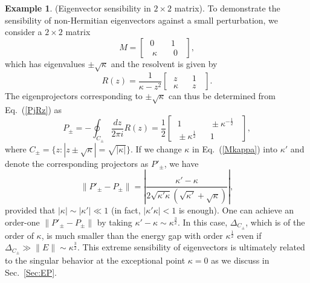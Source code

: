 \documentclass{tADP2e}
\theoremstyle{plain}
\theoremstyle{plain}
\theoremstyle{definition}
\newtheorem{example}{Example}[section]
\newcommand{\exmp}[1]{
\begin{example}
	#1
\end{example}
}
\begin{document}
\exmp{(Eigenvector sensibility in $2\times 2$ matrix). 
\label{Ex:ev}
To demonstrate the sensibility of non-Hermitian eigenvectors against a small perturbation, we consider a $2\times 2$ matrix
\begin{equation}
M=\begin{bmatrix} \;0\; & \;1\; \\ \;\;\kappa\;\; & \;\;0\;\; \end{bmatrix},
\label{Mkappa}
\end{equation}
which has eigenvalues $\pm\sqrt{\kappa}$ and the resolvent is given by
\begin{equation}
R(z)=\frac{1}{\kappa - z^2} \begin{bmatrix} \;z\; & \;\;1\;\; \\ \;\kappa\; & \;\;z\;\; \end{bmatrix}.
\end{equation}
The eigenprojectors corresponding to $\pm\sqrt{\kappa}$ can thus be determined from Eq.~(\ref{PjRz}) as
\begin{equation}
P_\pm=-\oint_{C_\pm} \frac{dz}{2\pi i}R(z)=\frac{1}{2}\begin{bmatrix} \;1\; & \;\;\pm\kappa^{-\frac{1}{2}}\;\; \\ \;\pm\kappa^{\frac{1}{2}}\; & \;\;1\;\; \end{bmatrix},
\label{Ppm}
\end{equation}
where $C_\pm=\{z:|z\pm\sqrt{\kappa}|=\sqrt{|\kappa|}\}$. If we change $\kappa$ in Eq.~(\ref{Mkappa}) into $\kappa'$ and denote the corresponding projectors as $P'_\pm$, we have
\begin{equation}
\|P'_\pm-P_\pm\|=\left|\frac{\kappa'-\kappa}{2\sqrt{\kappa'\kappa}(\sqrt{\kappa'}+\sqrt{\kappa})}\right|,
\end{equation}
provided that $|\kappa|\sim|\kappa'|\ll1$ (in fact, $|\kappa'\kappa|<1$ is enough). One can achieve an order-one $\|P'_\pm-P_\pm\|$ by taking $\kappa'-\kappa\sim\kappa^{\frac{3}{2}}$.  In this case, $\Delta_{C_\pm}$, which is of the order of $\kappa$, is much smaller than the energy gap with order $\kappa^{\frac{1}{2}}$ even if  $\Delta_{C_\pm}\gg\|E\|\sim\kappa^{\frac{3}{2}}$.  This extreme sensibility of eigenvectors is ultimately related to the singular behavior at the exceptional point $\kappa=0$ as we discuss in Sec.~\ref{Sec:EP}. 
}
\end{document}
